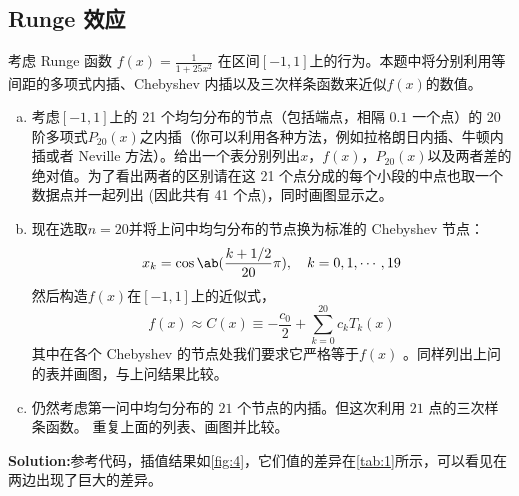 \documentclass[12pt, a4paper, oneside]{article}
\begin{document}
\clearpage
\subsection{Runge 效应}
考虑 Runge 函数 $f(x)=\frac{1}{1+25x^2}$ 在区间$[-1,1]$上的行为。本题中将分别利用等间距的多项式内插、Chebyshev 内插以及三次样条函数来近似$f(x)$的数值。
\begin{enumerate}[(a)]
    \item 考虑$[-1,1]$上的 21 个均匀分布的节点（包括端点，相隔 $0.1$ 一个点）的 $20$ 阶多项式$P_{20}(x)$之内插（你可以利用各种方法，例如拉格朗日内插、牛顿内插或者 Neville 方法）。给出一个表分别列出$x$，$f(x)$，$P_{20}(x)$以及两者差的绝对值。为了看出两者的区别请在这 21 个点分成的每个小段的中点也取一个数据点并一起列出 (因此共有 41 个点)，同时画图显示之。
    \item 现在选取$n=20$并将上问中均匀分布的节点换为标准的 Chebyshev 节点：
        $$x_k= \cos\ab(\frac{k+1/2}{20}\pi),\quad k=0,1,\cdots,19$$
        然后构造$f(x)$在$[-1,1]$上的近似式，
        $$f(x)\approx C(x)\equiv -\frac{c_0}{2}+\sum_{k=0}^{20}c_kT_k(x)$$
        其中在各个 Chebyshev 的节点处我们要求它严格等于$f(x)$ 。同样列出上问的表并画图，与上问结果比较。

    \item 仍然考虑第一问中均匀分布的 $21$ 个节点的内插。但这次利用 $21$ 点的三次样条函数。
    重复上面的列表、画图并比较。
\end{enumerate}

\textbf{Solution:}参考代码，插值结果如\autoref{fig:4}，它们值的差异在\autoref{tab:1}所示，可以看见在两边出现了巨大的差异。
\end{document}
